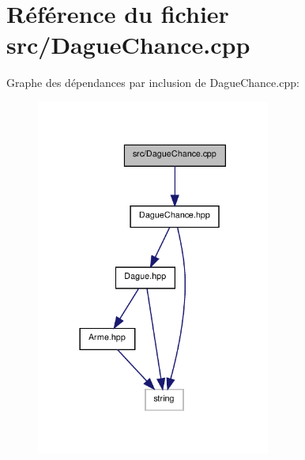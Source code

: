 \section{Référence du fichier src/\-Dague\-Chance.cpp}
\label{_dague_chance_8cpp}
Graphe des dépendances par inclusion de Dague\-Chance.\-cpp\-:\nopagebreak
\begin{figure}[H]
\begin{center}
\leavevmode
\includegraphics[width=218pt]{_dague_chance_8cpp__incl}
\end{center}
\end{figure}
